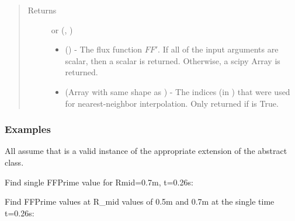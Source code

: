 \documentclass[letterpaper,10pt,english]{sphinxmanual}
\begin{document}
\begin{fulllineitems}
\begin{fulllineitems}
\begin{quote}
\begin{description}
\item[{Returns}] \leavevmode

 or (, )
\begin{itemize}
\item {} 
 () - The flux function \(FF'\).
If all of the input arguments are scalar, then a scalar is
returned. Otherwise, a scipy Array is returned.

\item {} 
 (Array with same shape as ) - The indices
(in ) that were used for
nearest-neighbor interpolation. Only returned if  is
True.

\end{itemize}


\end{description}\end{quote}
\subsubsection*{Examples}

All assume that  is a valid instance of the appropriate
extension of the {\hyperref[\detokenize{eqtools:eqtools.core.Equilibrium}]{}} abstract class.

Find single FFPrime value for Rmid=0.7m, t=0.26s:

\begin{sphinxVerbatim}[commandchars=\\\{\}]
   
\end{sphinxVerbatim}

Find FFPrime values at R\_mid values of 0.5m and 0.7m at the single time
t=0.26s:

\begin{sphinxVerbatim}[commandchars=\\\{\}]
  \PYG{p}{[} \PYG{p}{]} 
\end{sphinxVerbatim}


\end{fulllineitems}
\end{fulllineitems}
\end{document}
